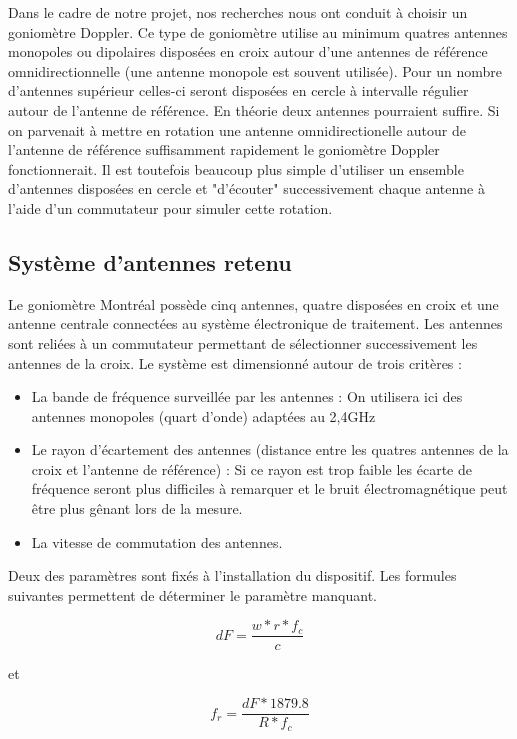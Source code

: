 	Dans le cadre de notre projet, nos recherches nous ont conduit à choisir un goniomètre Doppler. Ce type de goniomètre utilise au minimum quatres antennes monopoles ou dipolaires disposées en croix autour d'une antennes de référence omnidirectionnelle (une antenne monopole est souvent utilisée). Pour un nombre d'antennes supérieur celles-ci seront disposées en cercle à intervalle régulier autour de l'antenne de référence.
	En théorie deux antennes pourraient suffire. Si on parvenait à mettre en rotation une antenne omnidirectionelle autour de l'antenne de référence suffisamment rapidement le goniomètre Doppler fonctionnerait. Il est toutefois beaucoup plus simple d'utiliser un ensemble d'antennes disposées en cercle et "d'écouter" successivement chaque antenne à l'aide d'un commutateur pour simuler cette rotation.
	
\subsection{Système d'antennes retenu}

	Le goniomètre Montréal possède cinq antennes, quatre disposées en croix et une antenne centrale connectées au système électronique de traitement. Les antennes sont reliées à un commutateur permettant de sélectionner successivement les antennes de la croix. Le système est dimensionné autour de trois critères : 
	
\begin{itemize}

\item La bande de fréquence surveillée par les antennes : On utilisera ici des antennes monopoles (quart d'onde) adaptées au 2,4GHz

\item Le rayon d'écartement des antennes (distance entre les quatres antennes de la croix et l'antenne de référence) : Si ce rayon est trop faible les écarte de fréquence seront plus difficiles à remarquer et le bruit électromagnétique peut être plus gênant lors de la mesure.


\item La vitesse de commutation des antennes.

\end{itemize}

Deux des paramètres sont fixés à l'installation du dispositif. Les formules suivantes permettent de déterminer le paramètre manquant.

\begin{equation}
dF = \frac{w*r*f_c}{c}
\end{equation}

et

\begin{equation}
f_r = \frac{dF*1879.8}{R*f_c}
\end{equation}




